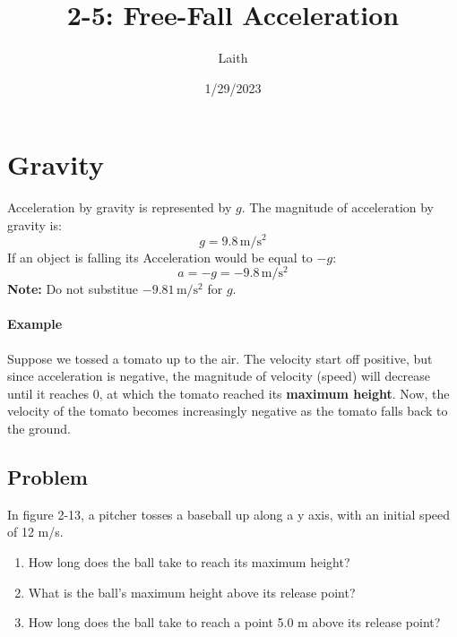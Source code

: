 \documentclass{article}
\author{Laith}
\title{2-5: Free-Fall Acceleration}
\date{1/29/2023}
\begin{document}
\maketitle
\section{Gravity}
Acceleration by gravity is represented by $g$. The magnitude of acceleration by
gravity is:
 \[g = 9.8\,\mathrm{m/s^2}\]
If an object is falling its Acceleration would be equal to $-g$:
    \[a = -g = -9.8\,\mathrm{m/s^2}\]
{\small\textbf{Note:} Do not substitue $-9.81\,\mathrm{m/s^2}$ for $g$.}
\paragraph*{Example}
Suppose we tossed a tomato up to the air. The velocity start off positive, but since
acceleration is negative, the magnitude of velocity (speed) will decrease until it reaches 0, at which the
tomato reached its \textbf{maximum height}. Now, the velocity of the tomato becomes 
increasingly negative as the tomato falls back to the ground.  
\begin{figure}[hh]
    \begin{center}
    \end{center}
\end{figure}

\subsection{Problem}
In figure 2-13, a pitcher tosses a baseball up along a y axis, with
an initial speed of 12 m/s. 
\begin{enumerate}[label=(\alph*)]
    \item How long does the ball take to reach its maximum height?
    \item What is the ball’s maximum height above its release point?
    \item How long does the ball take to reach a point 5.0 m above
its release point?
\end{enumerate}
\end{document}
